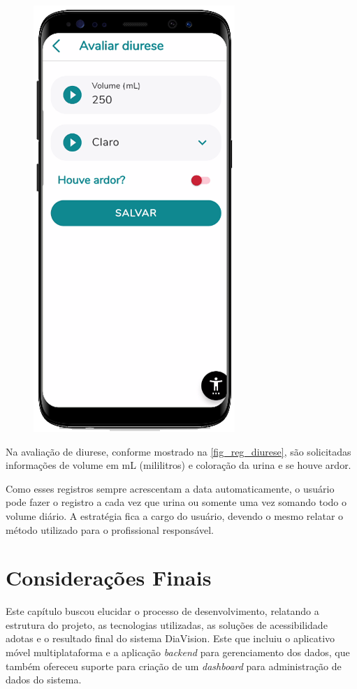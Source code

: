 \begin{figure}[htb]
\begin{minipage}{0.45\textwidth}
        \includegraphics[scale=0.66]{Imagens/desenvolvimento/app/reg_diurese.png}
    \end{minipage}
\end{figure}

Na avaliação de diurese, conforme mostrado na \autoref{fig_reg_diurese}, são solicitadas informações de volume em mL
(mililitros) e coloração da urina e se houve ardor.

Como esses registros sempre acrescentam a data automaticamente, o usuário pode fazer o registro
a cada vez que urina ou somente uma vez somando todo o volume diário. A estratégia fica a cargo do usuário,
devendo o mesmo relatar o método utilizado para o profissional responsável.

\section{Considerações Finais}

Este capítulo buscou elucidar o processo de desenvolvimento, relatando a estrutura do projeto, as tecnologias
utilizadas, as soluções de acessibilidade adotas e o resultado final do sistema DiaVision. Este que incluiu o
aplicativo móvel multiplataforma e a aplicação \emph{backend} para gerenciamento dos dados, que também ofereceu
suporte para criação de um \emph{dashboard} para administração de dados do sistema.